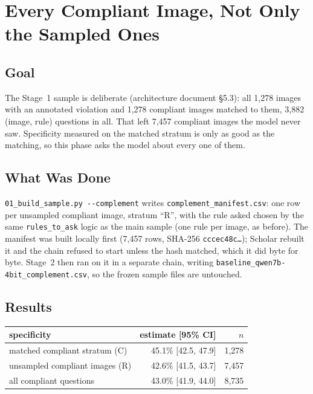 \chapter{Every Compliant Image, Not Only the Sampled Ones}
\label{chap:s2-2}

\section{Goal}

The Stage~1 sample is deliberate (architecture document \S5.3): all 1,278 images with an annotated violation
and 1,278 compliant images matched to them, 3,882 (image, rule) questions in all. That left 7,457 compliant
images the model never saw. Specificity measured on the matched stratum is only as good as the matching, so
this phase asks the model about every one of them.

\section{What Was Done}

\texttt{01\_build\_sample.py -{}-complement} writes \texttt{complement\_manifest.csv}: one row per unsampled
compliant image, stratum ``R'', with the rule asked chosen by the same \texttt{rules\_to\_ask} logic as the
main sample (one rule per image, as before). The manifest was built locally first (7,457 rows, SHA-256
\texttt{cccec48c\ldots}); Scholar rebuilt it and the chain refused to start unless the hash matched, which it
did byte for byte. Stage~2 then ran on it in a separate chain, writing
\texttt{baseline\_qwen7b-4bit\_complement.csv}, so the frozen sample files are untouched.

\section{Results}

\begin{center}
\begin{tabular}{p{6.4cm}rr}
\toprule
\textbf{specificity} & \textbf{estimate [95\% CI]} & $n$ \\
\midrule
matched compliant stratum (C)  & 45.1\% [42.5, 47.9] & 1,278 \\
unsampled compliant images (R) & 42.6\% [41.5, 43.7] & 7,457 \\
all compliant questions        & 43.0\% [41.9, 44.0] & 8,735 \\
\bottomrule
\end{tabular}
\label{tab:s22-spec}
\end{center}

